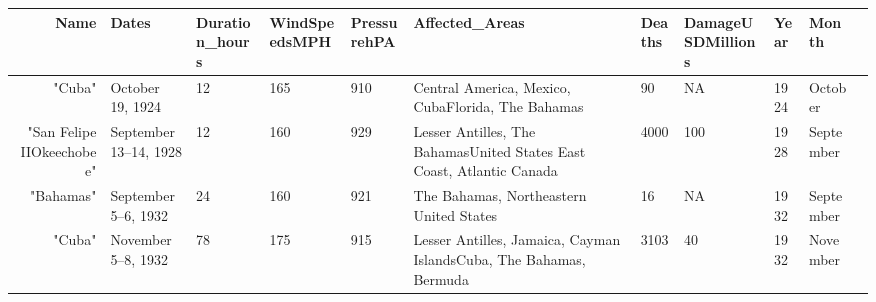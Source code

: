 \documentclass[11pt]{article}
\begin{document}
    
    \begin{tabular}{r|llllllllll}
 Name & Dates & Duration\_hours & WindSpeedsMPH & PressurehPA & Affected\_Areas & Deaths & DamageUSDMillions & Year & Month\\
\hline
	 "Cuba"                                                                & October 19, 1924                                                      & 12                                                                    & 165                                                                   & 910                                                                   & Central America, Mexico, CubaFlorida, The Bahamas                     &   90                                                                  &  NA                                                                   & 1924                                                                  & October                                                              \\
	 "San Felipe IIOkeechobee"                                             & September 13–14, 1928                                                 & 12                                                                    & 160                                                                   & 929                                                                   & Lesser Antilles, The BahamasUnited States East Coast, Atlantic Canada & 4000                                                                  & 100                                                                   & 1928                                                                  & September                                                            \\
	 "Bahamas"                                                             & September 5–6, 1932                                                   & 24                                                                    & 160                                                                   & 921                                                                   & The Bahamas, Northeastern United States                               &   16                                                                  &  NA                                                                   & 1932                                                                  & September                                                            \\
	 "Cuba"                                                                & November 5–8, 1932                                                    & 78                                                                    & 175                                                                   & 915                                                                   & Lesser Antilles, Jamaica, Cayman IslandsCuba, The Bahamas, Bermuda    & 3103                                                                  &  40                                                                   & 1932                                                                  & November                                                             \\

\end{tabular}
\end{document}

